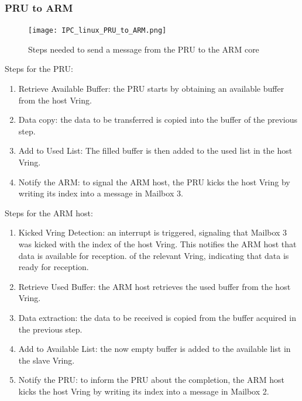 \subsubsection{PRU to ARM}

\begin{figure}[ht]
    \centering
    \texttt{[image: IPC\_linux\_PRU\_to\_ARM.png]}
    \caption{Steps needed to send a message from the PRU to the ARM core}
\end{figure}

Steps for the PRU:

\begin{enumerate}
    \item   Retrieve Available Buffer: the PRU starts by obtaining an
            available buffer from the host Vring.
    \item   Data copy: the data to be transferred is copied into the buffer 
            of the previous step.
    \item   Add to Used List: The filled buffer is then added to the
            used list in the host Vring.
    \item   Notify the ARM: to signal the ARM host, the PRU kicks the host 
            Vring by writing its index into a message in Mailbox 3.
\end{enumerate}

Steps for the ARM host:

\begin{enumerate}
    \item   Kicked Vring Detection: an interrupt is triggered, signaling that
            Mailbox 3 was kicked with the index of the host Vring.
            This notifies the ARM host that data is available for reception.
            of the relevant Vring, indicating that data is ready for reception.
    \item   Retrieve Used Buffer: the ARM host retrieves the used buffer
            from the host Vring.
    \item   Data extraction: the data to be received is copied from the buffer
            acquired in the previous step.
    \item   Add to Available List: the now empty buffer is added to the
            available list in the slave Vring.
    \item   Notify the PRU: to inform the PRU about the completion,
            the ARM host kicks the host Vring by writing its index into a
            message in Mailbox 2.
\end{enumerate}

